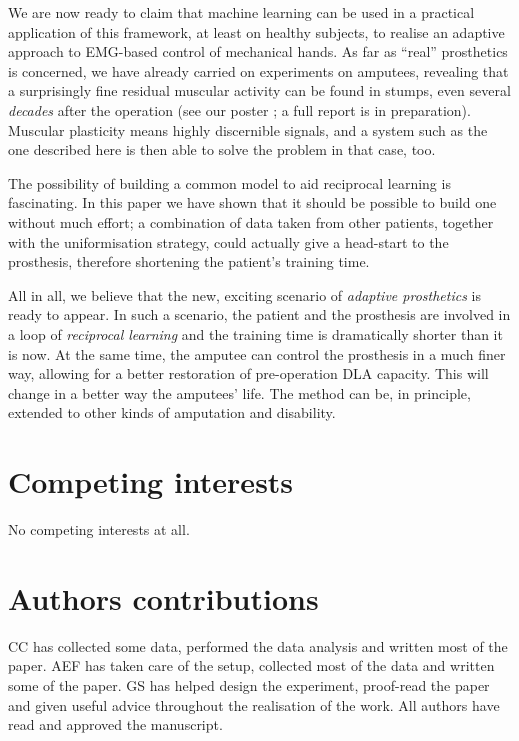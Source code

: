 \documentclass[10pt]{bmc_article}
\newenvironment{bmcformat}{\begin{raggedright}\baselineskip20pt\sloppy\setboolean{publ}{false}}{\end{raggedright}\baselineskip20pt\sloppy}
\begin{document}
\begin{bmcformat}
We are now ready to claim that machine learning can be used in a
practical application of this framework, at least on healthy subjects,
to realise an adaptive approach to EMG-based control of mechanical
hands. As far as ``real'' prosthetics is concerned, we have already
carried on experiments on amputees, revealing that a surprisingly fine
residual muscular activity can be found in stumps, even several
\emph{decades} after the operation (see our poster
\cite{2008.Neurorob}; a full report is in preparation). Muscular
plasticity means highly discernible signals, and a system such as the
one described here is then able to solve the problem in that case,
too.

The possibility of building a common model to aid reciprocal learning
is fascinating. In this paper we have shown that it should be possible
to build one without much effort; a combination of data taken from
other patients, together with the uniformisation strategy, could
actually give a head-start to the prosthesis, therefore shortening the
patient's training time.

All in all, we believe that the new, exciting scenario of
\emph{adaptive prosthetics} is ready to appear. In such a scenario,
the patient and the prosthesis are involved in a loop of
\emph{reciprocal learning} and the training time is dramatically
shorter than it is now. At the same time, the amputee can control the
prosthesis in a much finer way, allowing for a better restoration of
pre-operation DLA capacity. This will change in a better way the
amputees' life. The method can be, in principle, extended to other
kinds of amputation and disability.

\section*{Competing interests}

No competing interests at all.

\section*{Authors contributions}

CC has collected some data, performed the data analysis and written most of the paper. AEF has taken care of the setup, collected most of the data and written some of the paper. GS has helped design the experiment, proof-read the paper and given useful advice throughout the realisation of the work. All authors have read and approved the manuscript.


\end{bmcformat}
\end{document}

